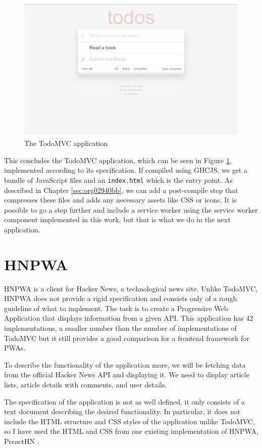 \documentclass[english,zadani,odsaz]{fitthesis}
\begin{document}
\begin{figure}[!t]
\centering
\includegraphics[height=7cm]{obrazky-figures/screenshot-todomvc.png}
\caption{The TodoMVC application \label{todomvc-app}}
\end{figure}

This concludes the TodoMVC application, which can be seen in Figure
\ref{todomvc-app}, implemented according to its specification. If compiled using
GHCJS, we get a bundle of JavaScript files and an \texttt{index.html} which is the entry
point. As described in Chapter \ref{sec:org02940bb}, we can add a post-compile step that
compresses these files and adds any necessary assets like CSS or icons. It is
possible to go a step further and include a service worker using the service
worker component implemented in this work, but that is what we do in the next
application.

\section{HNPWA}
\label{sec:orga6de672}
HNPWA \cite{hnpwa} is a client for Hacker News, a technological news site. Unlike
TodoMVC, HNPWA does not provide a rigid specification and consists only of a
rough guideline of what to implement. The task is to create a Progressive Web
Application that displays information from a given API. This application has 42
implementations, a smaller number than the number of implementations of TodoMVC
but it still provides a good comparison for a frontend framework for PWAs.

To describe the functionality of the application more, we will be fetching data
from the official Hacker News API and displaying it. We need to display article
lists, article details with comments, and user details.

The specification of the application is not as well defined, it only consists of
a text document describing the desired functionality. In particular, it does not
include the HTML structure and CSS styles of the application unlike TodoMVC, so
I have used the HTML and CSS from one existing implementation of HNPWA, PreactHN
\cite{preacthn}.
\end{document}
